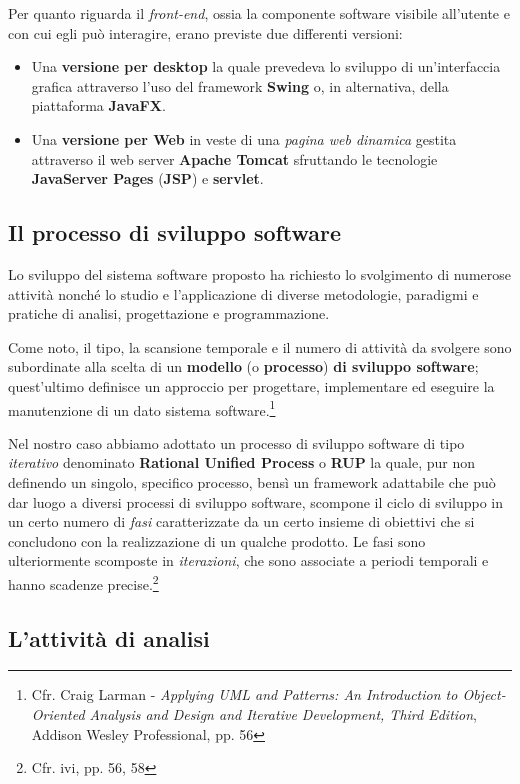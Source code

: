 \documentclass[10pt,a4paper, titlepage]{article}
\begin{document}
Per quanto riguarda il \textit{front-end}, ossia la componente software visibile all'utente e con cui egli può interagire, erano previste due differenti versioni:

\begin{itemize}
\item Una \textbf{versione per desktop} la quale prevedeva lo sviluppo di un'interfaccia grafica attraverso l'uso del framework \textbf{Swing} o, in alternativa, della piattaforma \textbf{JavaFX}.
\item Una \textbf{versione per Web} in veste di una \textit{pagina web dinamica} gestita attraverso il web server \textbf{Apache Tomcat} sfruttando le tecnologie \textbf{JavaServer Pages} (\textbf{JSP}) e \textbf{servlet}.
\end{itemize}

\subsection{Il processo di sviluppo software}

Lo sviluppo del sistema software proposto ha richiesto lo svolgimento di numerose attività nonché lo studio e l'applicazione di diverse metodologie, paradigmi e pratiche di analisi, progettazione e programmazione. 

Come noto, il tipo, la scansione temporale e il numero di attività da svolgere sono subordinate alla scelta di un \textbf{modello} (o \textbf{processo}) \textbf{di sviluppo software}; quest'ultimo definisce un approccio per progettare, implementare ed eseguire la manutenzione di un dato sistema software.\footnote{Cfr. Craig Larman - \textit{Applying UML and Patterns: An Introduction to Object-Oriented Analysis and Design and Iterative Development, Third Edition}, Addison Wesley Professional, pp. 56} 

Nel nostro caso abbiamo adottato un processo di sviluppo software di tipo \textit{iterativo} denominato \textbf{Rational Unified Process} o \textbf{RUP} la quale, pur non definendo un singolo, specifico processo, bensì un framework adattabile che può dar luogo a diversi processi di sviluppo software, scompone il ciclo di sviluppo in un certo numero di \textit{fasi} caratterizzate da un certo insieme di obiettivi che si concludono con la realizzazione di un qualche prodotto. Le fasi sono ulteriormente scomposte in \textit{iterazioni}, che sono associate a periodi temporali e hanno scadenze precise.\footnote{Cfr. ivi, pp. 56, 58}

\subsection{L'attività di analisi}
\end{document}
